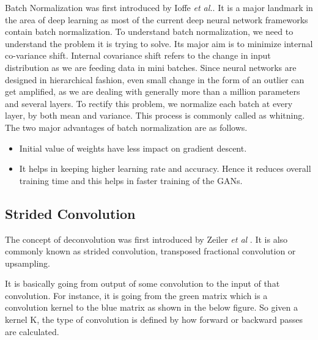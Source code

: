 Batch Normalization was first introduced by Ioffe  \textit{et al.}\cite{BatchNorm}. It is a major landmark in the area of deep learning as most of the current deep neural network frameworks contain batch normalization. 
To understand batch normalization, we need to understand the problem it is trying to solve. Its major aim is to minimize internal co-variance shift. Internal covariance shift refers to the change in input distribution as we are feeding data in mini batches. Since neural networks are designed in hierarchical fashion, even small change in the form of an outlier can get amplified, as we are dealing with generally more than a million parameters and several layers. To rectify this problem, we normalize each batch at every layer, by both mean and variance. This process is commonly called as whitning. The two major advantages of batch normalization are as follows.
\begin{itemize}
    \item Initial value of weights have less impact on gradient descent.
    \item It helps in keeping higher learning rate and accuracy. Hence it reduces overall training time and this helps in faster training of the GANs.
\end{itemize}

\subsection{Strided Convolution}

The concept of deconvolution was first introduced by Zeiler \textit{et al} \cite{Deconv}. It is also commonly known as  strided convolution, transposed fractional convolution or upsampling.

\par
It is basically going from output of some convolution to the input of that convolution. For instance, it is going from the green matrix which is a convolution kernel to the blue matrix as shown in the below figure. So given a kernel K, the type of convolution is defined by how forward or backward passes are calculated\cite{Deconv-Theano}.


